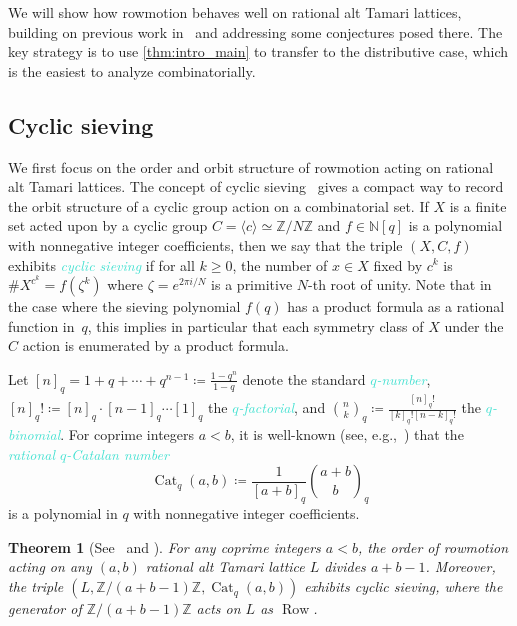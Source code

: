 \documentclass[11pt]{amsart}
\DeclareMathOperator{\cat}{Cat}
\DeclareMathOperator{\row}{Row}
\newcommand{\dfn}[1]{\textcolor{Turquoise}{\emph{#1}}}
\newtheorem{theorem}{Theorem}[section]
\theoremstyle{definition}
\begin{document}
We will show how rowmotion behaves well on rational alt Tamari lattices, building on previous work in~\cite{thomas2019rowmotion, defant2024tamari} and addressing some conjectures posed there. The key strategy is to use \cref{thm:intro_main} to transfer to the distributive case, which is the easiest to analyze combinatorially.

\subsection{Cyclic sieving}

We first focus on the order and orbit structure of rowmotion acting on rational alt Tamari lattices. The concept of cyclic sieving~\cite{reiner2004cyclic, sagan2011cyclic} gives a compact way to record the orbit structure of a cyclic group action on a combinatorial set. If $X$ is a finite set acted upon by a cyclic group $C=\langle c \rangle\simeq \mathbb{Z}/N\mathbb{Z}$ and $f\in \mathbb{N}[q]$ is a polynomial with nonnegative integer coefficients, then we say that the triple $(X,C,f)$ exhibits \dfn{cyclic sieving} if for all $k\geq 0$, the number of $x\in X$ fixed by $c^k$ is $\#X^{c^k}=f(\zeta^{k})$ where $\zeta=e^{2\pi i/N}$ is a primitive $N$-th root of unity. Note that in the case where the sieving polynomial $f(q)$ has a product formula as a rational function in~$q$, this implies in particular that each symmetry class of $X$ under the $C$ action is enumerated by a product formula.

Let $[n]_q=1+q+\cdots+q^{n-1} \coloneqq \frac{1-q^n}{1-q}$ denote the standard \dfn{$q$-number}, $[n]_q! \coloneqq [n]_q\cdot[n-1]_q\cdots[1]_q$ the \dfn{$q$-factorial}, and $\binom{n}{k}_q \coloneqq \frac{[n]_q!}{[k]_q![n-k]_q!}$ the \dfn{$q$-binomial}. For coprime integers $a<b$, it is well-known (see, e.g.,~\cite[\S4]{armstrong2016rational}) that the \dfn{rational $q$-Catalan number}
\[\cat_q(a,b) \coloneqq \frac{1}{[a+b]_q}\binom{a+b}{b}_q\]
is a polynomial in $q$ with nonnegative integer coefficients.

\begin{theorem}[{See~\cite[Conjecture 5.15]{defant2024tamari} and \cite[\S7.6]{thomas2019rowmotion}}]
For any coprime integers $a<b$, the order of rowmotion acting on any $(a,b)$ rational alt Tamari lattice $L$ divides $a+b-1$. Moreover, the triple $(L,\mathbb{Z}/(a+b-1)\mathbb{Z},\cat_q(a,b))$ exhibits cyclic sieving, where the generator of $\mathbb{Z}/(a+b-1)\mathbb{Z}$ acts on $L$ as $\row$.
\end{theorem}
\end{document}
